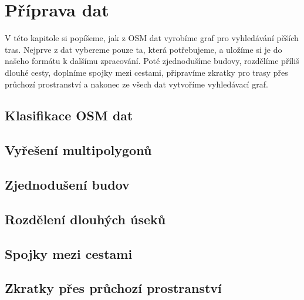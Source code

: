 \chapter{Příprava dat}
V této kapitole si popíšeme, jak z OSM dat vyrobíme graf pro vyhledávání pěších
tras. Nejprve z dat vybereme pouze ta, která potřebujeme, a uložíme si je do
našeho formátu k dalšímu zpracování. Poté zjednodušíme budovy, rozdělíme příliš
dlouhé cesty, doplníme spojky mezi cestami, připravíme zkratky pro trasy přes
průchozí prostranství a nakonec ze všech dat vytvoříme vyhledávací graf.

\section{Klasifikace OSM dat}

\section{Vyřešení multipolygonů}

\section{Zjednodušení budov}

\section{Rozdělení dlouhých úseků}

\section{Spojky mezi cestami}

\section{Zkratky přes průchozí prostranství}
